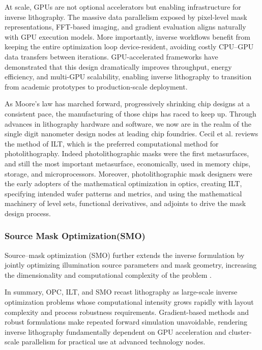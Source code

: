 \documentclass[pdflatex,sn-mathphys-num]{sn-jnl}%
\theoremstyle{thmstyleone}%
\theoremstyle{thmstyletwo}%
\theoremstyle{thmstylethree}%
\begin{document}
At scale, GPUs are not optional accelerators but enabling infrastructure for inverse lithography. The massive data parallelism exposed by pixel-level mask representations, FFT-based imaging, and gradient evaluation aligns naturally with GPU execution models. More importantly, inverse workflows benefit from keeping the entire optimization loop device-resident, avoiding costly CPU–GPU data transfers between iterations. GPU-accelerated frameworks have demonstrated that this design dramatically improves throughput, energy efficiency, and multi-GPU scalability, enabling inverse lithography to transition from academic prototypes to production-scale deployment.


As Moore’s law has marched forward, progressively shrinking chip designs at a consistent pace, the manufacturing 
of those chips has raced to keep up. Through advances in lithography hardware and software, we now are in the realm of the single digit nanometer
design nodes at leading chip foundries. Cecil et al.\cite{cecil2022advances} reviews the method of ILT, which is the preferred computational
method for photolithography. Indeed photolithographic masks were the first metasurfaces, and still the most important metasurface, economically, 
used in memory chips, storage, and microprocessors. Moreover, photolithographic mask designers were the early adopters of the mathematical optimization
in optics, creating ILT, specifying intended wafer patterns and metrics, and using the mathematical machinery of level sets, functional derivatives, 
and adjoints to drive the mask design process.



\subsubsection{Source Mask Optimization(SMO)}
Source–mask optimization (SMO) further extends the inverse formulation by jointly optimizing illumination source parameters and mask geometry, increasing the dimensionality and computational complexity of the problem \cite{Socha66}.



In summary, OPC, ILT, and SMO recast lithography as large-scale inverse optimization problems whose computational intensity grows rapidly with layout complexity and process robustness requirements. Gradient-based methods and robust formulations make repeated forward simulation unavoidable, rendering inverse lithography fundamentally dependent on GPU acceleration and cluster-scale parallelism for practical use at advanced technology nodes. 
\end{document}
